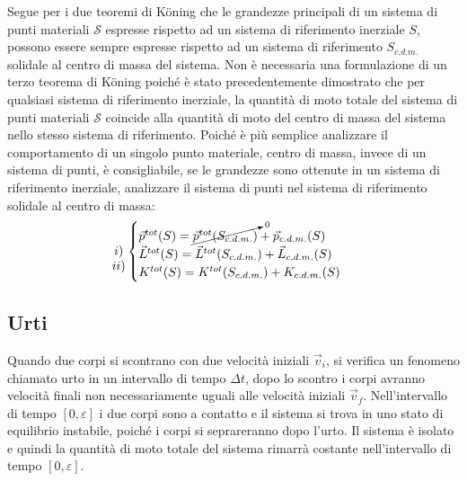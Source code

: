 \documentclass{article}
\numberwithin{equation}{subsection}
\begin{document}
Segue per i due teoremi di K\"oning che le grandezze principali di un sistema di punti materiali $\mathscr{S}$ espresse rispetto ad 
un sistema di riferimento inerziale $S$, possono essere sempre espresse 
rispetto ad un sistema di riferimento $S_{c.d.m.}$ solidale al centro di massa del sistema. Non è necessaria una formulazione di un terzo teorema di K\"oning poiché 
è stato precedentemente dimostrato che per qualsiasi sistema di riferimento inerziale, la quantità di moto totale del sistema di punti materiali $\mathscr{S}$ coincide 
alla quantità di moto del centro di massa del sistema nello stesso sistema di riferimento. Poiché è più semplice analizzare il comportamento di un singolo punto materiale, 
centro di massa, 
invece di un sistema di punti, è consigliabile, se le grandezze sono ottenute in un sistema di riferimento inerziale, analizzare il sistema di punti nel sistema di riferimento 
solidale al centro di massa: 
\begin{equation}
    \begin{matrix}
        \\
        i)
        \\
        ii)
    \end{matrix}
    \begin{cases}
        \vec{p}^{tot}(S)=\cancelto{0}{\vec p^{tot}(S_{c.d.m.})}+\vec{p}_{c.d.m.}(S)\\
        \vec{L}^{tot}(S)=\vec{L}^{tot}(S_{c.d.m.})+\vec{L}_{c.d.m.}(S)\\
        K^{tot}(S)=K^{tot}(S_{c.d.m.})+K_{c.d.m.}(S)
    \end{cases}
\end{equation}

\subsection{Urti}
Quando due corpi si scontrano con due velocità iniziali $\vec{v}_i$, 
si verifica un fenomeno 
chiamato urto in un intervallo di tempo $\Delta t$, dopo 
lo scontro i corpi avranno velocità finali non necessariamente 
uguali alle velocità iniziali $\vec{v}_f$. Nell'intervallo di tempo 
$[0,\varepsilon]$ i due corpi sono a contatto e il sistema si trova 
in uno stato di equilibrio instabile, poiché i corpi si 
seprareranno dopo l'urto. Il sistema è isolato e quindi la 
quantità di moto totale del sistema rimarrà costante nell'intervallo 
di tempo $[0,\varepsilon]$. 

 
\end{document}
